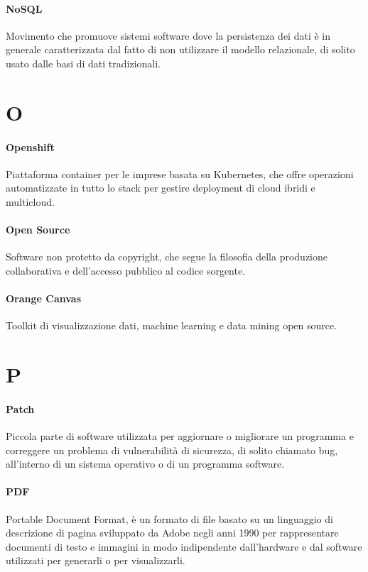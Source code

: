 \documentclass[]{article}
\begin{document}
	\paragraph*{NoSQL}
	Movimento che promuove sistemi software dove la persistenza dei dati è in generale caratterizzata dal fatto di non utilizzare il modello relazionale, di solito usato dalle basi di dati tradizionali.

	\newpage

	\section*{O}

	\paragraph*{Openshift}
	Piattaforma container per le imprese basata su Kubernetes, che offre operazioni automatizzate in tutto lo stack per gestire deployment di cloud ibridi e multicloud.

	\paragraph*{Open Source}
	Software non protetto da copyright, che segue la filosofia della produzione collaborativa e dell'accesso pubblico al codice sorgente.

	\paragraph*{Orange Canvas}
	Toolkit di visualizzazione dati, machine learning e data mining open source.

	\newpage

	\section*{P}

	\paragraph*{Patch}
	Piccola parte di software utilizzata per aggiornare o migliorare un programma e correggere un problema di vulnerabilità di sicurezza, di solito chiamato bug, all'interno di un sistema operativo o di un programma software.

	\paragraph*{PDF}
	Portable Document Format, è un formato di file basato su un linguaggio di descrizione di pagina sviluppato da Adobe negli anni 1990 per rappresentare documenti di testo e immagini in modo indipendente dall'hardware e dal software utilizzati per generarli o per visualizzarli.
\end{document}
